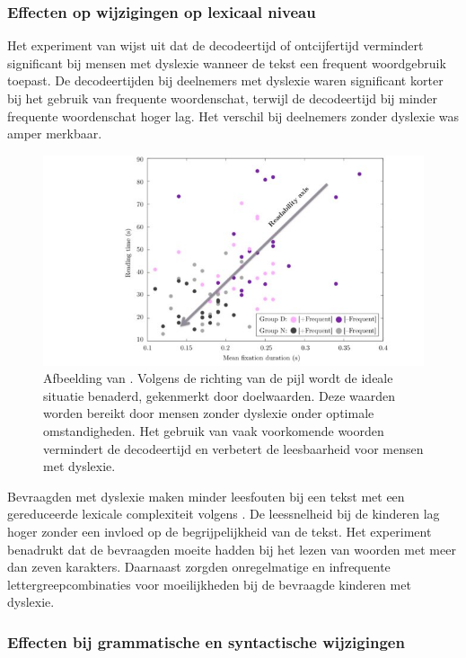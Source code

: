 \subsubsection{Effecten op wijzigingen op lexicaal niveau}

Het experiment van \textcite{Rello2013a} wijst uit dat de decodeertijd of ontcijfertijd vermindert significant bij mensen met dyslexie wanneer de tekst een frequent woordgebruik toepast. De decodeertijden bij deelnemers met dyslexie waren significant korter bij het gebruik van frequente woordenschat, terwijl de decodeertijd bij minder frequente woordenschat hoger lag. Het verschil bij deelnemers zonder dyslexie was amper merkbaar.

\begin{figure}
	\includegraphics[width=\linewidth]{img/readability-mean-fixation-duration.png}
	\caption{Afbeelding van \textcite{Rello2013a}. Volgens de richting van de pijl wordt de ideale situatie benaderd, gekenmerkt door doelwaarden. Deze waarden worden bereikt door mensen zonder dyslexie onder optimale omstandigheden. Het gebruik van vaak voorkomende woorden vermindert de decodeertijd en verbetert de leesbaarheid voor mensen met dyslexie.}
\end{figure}

Bevraagden met dyslexie maken minder leesfouten bij een tekst met een gereduceerde lexicale complexiteit volgens \textcite{Gala2016}. De leessnelheid bij de kinderen lag hoger zonder een invloed op de begrijpelijkheid van de tekst. Het experiment benadrukt dat de bevraagden moeite hadden bij het lezen van woorden met meer dan zeven karakters. Daarnaast zorgden onregelmatige en infrequente lettergreepcombinaties voor moeilijkheden bij de bevraagde kinderen met dyslexie.

\subsubsection{Effecten bij grammatische en syntactische wijzigingen}

